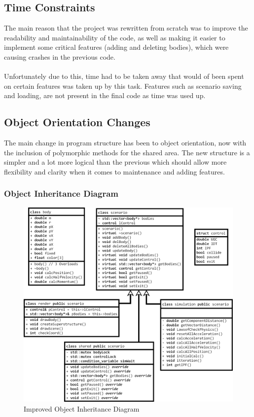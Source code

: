 {\pagebreak

\subsection{Time Constraints}
The main reason that the project was rewritten from scratch was to improve the readability and maintainability of the code, as well as making it easier to implement some critical features (adding and deleting bodies), which were causing crashes in the previous code.

\paragraph{}
Unfortunately due to this, time had to be taken away that would of been spent on certain features was taken up by this task. Features such as scenario saving and loading, are not present in the final code as time was used up.

\subsection{Object Orientation Changes}
The main change in program structure has been to object orientation, now with the inclusion of polymorphic methods for the shared area. The new structure is a simpler and a lot more logical than the previous which should allow more flexibility and clarity when it comes to maintenance and adding features.

\pagebreak
\subsubsection{Object Inheritance Diagram}
\begin{figure}[!ht]
  \centering
  \includegraphics[width=\textwidth]{img/didredo.png}
  \caption{Improved Object Inheritance Diagram}
\end{figure}

}
